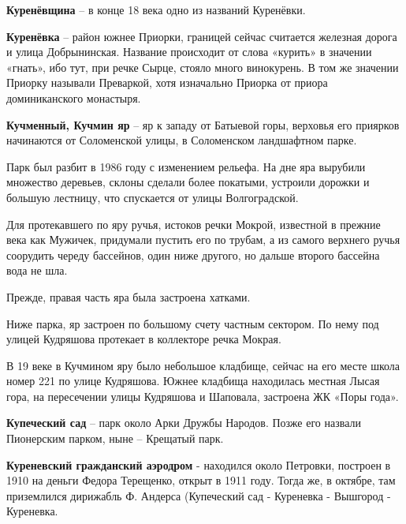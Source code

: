 \medskip

\textbf{Куренёвщина} – в конце 18 века одно из названий Куренёвки.\\

\medskip

\textbf{Куренёвка} – район южнее Приорки, границей сейчас считается железная дорога и улица Добрынинская. Название происходит от слова «курить» в значении «гнать», ибо тут, при речке Сырце, стояло много винокурень. В том же значении Приорку называли Преваркой, хотя изначально Приорка от приора доминиканского монастыря.\\

\medskip

\textbf{Кучменный, Кучмин яр} – яр к западу от Батыевой горы, верховья его приярков начинаются от Соломенской улицы, в Соломенском ландшафтном парке.

Парк был разбит в 1986 году с изменением рельефа. На дне яра вырубили множество деревьев, склоны сделали более покатыми, устроили дорожки и большую лестницу, что спускается от улицы Волгоградской. 

Для протекавшего по яру ручья, истоков речки Мокрой, известной в прежние века как Мужичек, придумали пустить его по трубам, а из самого верхнего ручья соорудить череду бассейнов, один ниже другого, но дальше второго бассейна вода не шла.

Прежде, правая часть яра была застроена хатками.

Ниже парка, яр застроен по большому счету частным сектором. По нему под улицей Кудряшова протекает в коллекторе речка Мокрая. 

В 19 веке в Кучмином яру было небольшое кладбище, сейчас на его месте школа номер 221 по улице Кудряшова. Южнее кладбища находилась местная Лысая гора, на пересечении улицы Кудряшова и Шаповала, застроена ЖК «Поры года».\\


\medskip

\textbf{Купеческий сад} – парк около Арки Дружбы Народов. Позже его назвали Пионерским парком, ныне – Крещатый парк.\\

\medskip

\textbf{Куреневский гражданский аэродром} - находился около Петровки, построен в 1910 на деньги Федора Терещенко, открыт в 1911 году. Тогда же, в октябре, там приземлился дирижабль Ф. Андерса (Купеческий сад - Куреневка - Вышгород - Куреневка.\\ 

